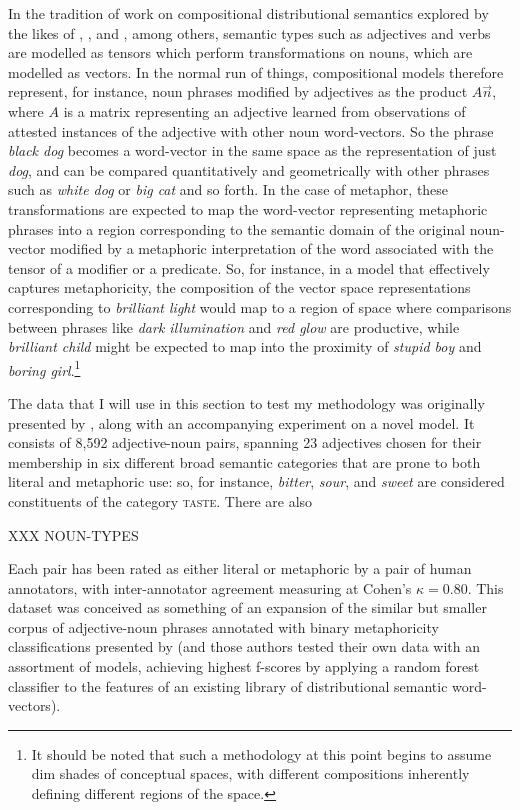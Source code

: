 In the tradition of work on compositional distributional semantics explored by the likes of \cite{MitchellEA2010}, \cite{BaroniEA2010}, and \cite{CoeckeEA2011}, among others, semantic types such as adjectives and verbs are modelled as tensors which perform transformations on nouns, which are modelled as vectors.  In the normal run of things, compositional models therefore represent, for instance, noun phrases modified by adjectives as the product $A\overrightarrow{n}$, where $A$ is a matrix representing an adjective learned from observations of attested instances of the adjective with other noun word-vectors.  So the phrase \emph{black dog} becomes a word-vector in the same space as the representation of just \emph{dog}, and can be compared quantitatively and geometrically with other phrases such as \emph{white dog} or \emph{big cat} and so forth.  In the case of metaphor, these transformations are expected to map the word-vector representing metaphoric phrases into a region corresponding to the semantic domain of the original noun-vector modified by a metaphoric interpretation of the word associated with the tensor of a modifier or a predicate.  So, for instance, in a model that effectively captures metaphoricity, the composition of the vector space representations corresponding to \emph{brilliant light} would map to a region of space where comparisons between phrases like \emph{dark illumination} and \emph{red glow} are productive, while \emph{brilliant child} might be expected to map into the proximity of \emph{stupid boy} and \emph{boring girl}.\footnote{It should be noted that such a methodology at this point begins to assume dim shades of  conceptual spaces, with different compositions inherently defining different regions of the space.}

The data that I will use in this section to test my methodology was originally presented by \cite{GutierrezEA2016}, along with an accompanying experiment on a novel model.  It consists of 8,592 adjective-noun pairs, spanning 23 adjectives chosen for their membership in six different broad semantic categories that are prone to both literal and metaphoric use: so, for instance, \emph{bitter}, \emph{sour}, and \emph{sweet} are considered constituents of the category \textsc{taste}.  There are also

XXX NOUN-TYPES

Each pair has been rated as either literal or metaphoric by a pair of human annotators, with inter-annotator agreement measuring at Cohen's $\kappa = 0.80$.  This dataset was conceived as something of an expansion of the similar but smaller corpus of adjective-noun phrases annotated with binary metaphoricity classifications presented by \cite{TsvetkovEA2014} (and those authors tested their own data with an assortment of models, achieving highest f-scores by applying a random forest classifier to the features of an existing library of distributional semantic word-vectors).

